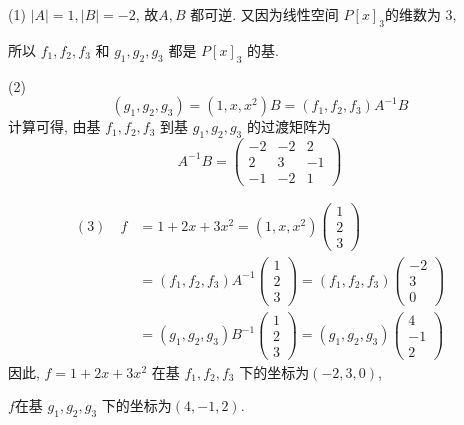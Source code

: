 \documentclass[13pt]{beamer}
\begin{document}
\begin{frame}
(1) $|A|=1,|B|=-2$, 故$A, B$ 都可逆.  又因为线性空间 $P[x]_{3}$的维数为 3, 

所以 $f_{1}, f_{2}, f_{3}$ 和
$g_{1}, g_{2}, g_{3}$ 都是 $P[x]_{3}$ 的基.


(2) $$\left(g_{1}, g_{2}, g_{3}\right)=\left(1, x, x^{2}\right) B=\left(f_{1}, f_{2}, f_{3}\right) A^{-1} B$$
计算可得, 由基 $f_{1}, f_{2}, f_{3}$ 到基 $g_{1}, g_{2}, g_{3}$ 的过渡矩阵为
 $$A^{-1} B=\left(\begin{array}{ccc}-2 & -2 & 2 \\ 2 & 3 & -1 \\ -1 & -2 & 1\end{array}\right)$$
\end{frame}
\begin{frame}

\begin{align*}
(3) \quad f & =1+2 x+3 x^{2}  =\left(1, x, x^{2}\right)\left(\begin{array}{l}1 \\ 2 \\ 3\end{array}\right)\\
  & =\left(f_{1}, f_{2}, f_{3}\right) A^{-1}\left(\begin{array}{l}1 \\ 2 \\ 3\end{array}\right)
     =\left(f_{1}, f_{2}, f_{3}\right)\left(\begin{array}{c}-2 \\ 3 \\ 0\end{array}\right)\\
   & =\left(g_{1}, g_{2}, g_{3}\right) B^{-1}\left(\begin{array}{l}1 \\ 2 \\ 3\end{array}\right)
      =\left(g_{1}, g_{2}, g_{3}\right)\left(\begin{array}{c}4 \\ -1 \\ 2\end{array}\right)
\end{align*}
因此, $f=1+2 x+3 x^{2}$ 在基 $f_{1}, f_{2}, f_{3}$ 下的坐标为$(-2,3,0)$,

$f$在基 $g_{1}, g_{2}, g_{3}$ 下的坐标为$(4,-1,2)$.
\end{frame}
\end{document}
